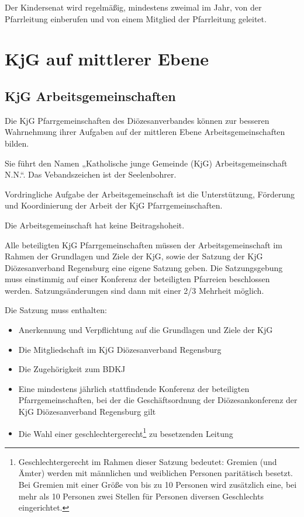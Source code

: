 \documentclass[12pt]{report}
\begin{document}
\begin{flushleft}
Der Kindersenat wird regelmäßig, mindestens zweimal im Jahr, von der Pfarrleitung einberufen
und von einem Mitglied der Pfarrleitung geleitet.

\chapter{KjG auf mittlerer Ebene}

\section{KjG Arbeitsgemeinschaften}

Die KjG Pfarrgemeinschaften des Diözesanverbandes können zur besseren Wahrnehmung ihrer
Aufgaben auf der mittleren Ebene Arbeitsgemeinschaften bilden.

Sie führt den Namen „Katholische junge Gemeinde (KjG) Arbeitsgemeinschaft N.N.“.
Das Vebandszeichen ist der Seelenbohrer.

Vordringliche Aufgabe der Arbeitsgemeinschaft ist die Unterstützung, Förderung und Koordinierung
der Arbeit der KjG Pfarrgemeinschaften.

Die Arbeitsgemeinschaft hat keine Beitragshoheit.

Alle beteiligten KjG Pfarrgemeinschaften müssen der Arbeitsgemeinschaft im Rahmen der Grundlagen
und Ziele der KjG, sowie der Satzung der KjG Diözesanverband Regensburg eine eigene
Satzung geben. Die Satzungsgebung muss einstimmig auf einer Konferenz der beteiligten Pfarreien
beschlossen werden. Satzungsänderungen sind dann mit einer 2/3 Mehrheit möglich.

Die Satzung muss enthalten:
\begin{itemize}
  \item Anerkennung und Verpflichtung auf die Grundlagen und Ziele der KjG
  \item Die Mitgliedschaft im KjG Diözesanverband Regensburg
  \item Die Zugehörigkeit zum BDKJ
  \item Eine mindestens jährlich stattfindende Konferenz der beteiligten Pfarrgemeinschaften, bei der
        die Geschäftsordnung der Diözesankonferenz der KjG Diözesanverband Regensburg gilt
  \item Die Wahl einer geschlechtergerecht\footnote{Geschlechtergerecht im Rahmen dieser Satzung bedeutet: Gremien (und Ämter) werden mit männlichen und
weiblichen Personen paritätisch besetzt. Bei Gremien mit einer Größe von bis zu 10 Personen wird zusätzlich
eine, bei mehr als 10 Personen zwei Stellen für Personen diversen Geschlechts eingerichtet.} zu besetzenden Leitung
\end{itemize}


\end{flushleft}
\end{document}
